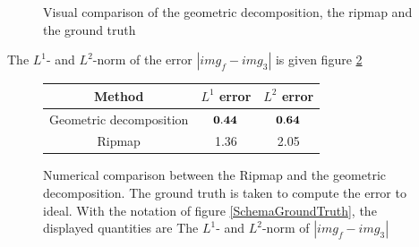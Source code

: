 \begin{figure}
\centering
{}
\caption{Visual comparison of the geometric decomposition, the ripmap and the ground truth}
\label{VisualComparisonDecRipGrd}
\end{figure}

The $L^1$- and $L^2$-norm of the error $|img_f-img_3|$ is given figure \ref{NumericalComparisonDecRipGrd}

\begin{figure}
\centering
\begin{tabular}{|c|c|c|}
\hline
Method & $L^1$ error  & $L^2$ error\\
\hline
Geometric decomposition & $\bf{0.44}$ & $\bf{0.64}$\\
\hline
Ripmap & 1.36 & 2.05\\
\hline
\end{tabular}
\caption{Numerical comparison between the Ripmap and the geometric decomposition. The ground truth is taken to compute the error to ideal. With the notation of figure \ref{SchemaGroundTruth}, the displayed quantities are The $L^1$- and $L^2$-norm of $|img_f-img_3|$}
\label{NumericalComparisonDecRipGrd}
\end{figure}